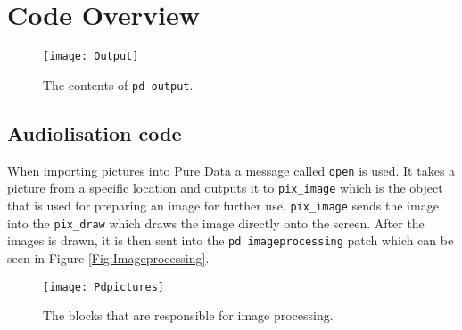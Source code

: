 \chapter{Code Overview}\label{ch:codeoverview}


\begin{figure}
\centering
\texttt{[image: Output]}
\caption{The contents of \texttt{pd output}.}
\label{Fig:Output}
\end{figure}

\section{Audiolisation code}
When importing pictures into Pure Data a message called \texttt{open} is used. It takes a picture from a specific location and outputs it to \texttt{pix\_image} which is the object that is used for preparing an image for further use. \texttt{pix\_image} sends the image into the \texttt{pix\_draw} which draws the image directly onto the screen. After the images is drawn, it is then sent into the \texttt{pd imageprocessing} patch which can be seen in Figure \ref{Fig:Imageprocessing}.

\begin{figure}
\centering
\texttt{[image: Pdpictures]}
\caption{The blocks that are responsible for image processing.}
\label{Fig:pdpicture}
\end{figure}

